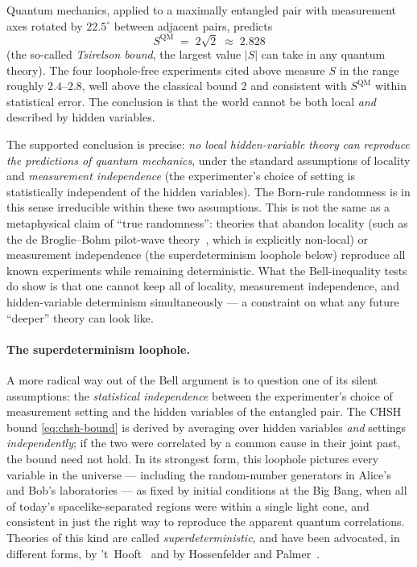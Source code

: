 Quantum mechanics, applied to a maximally entangled pair with
measurement axes rotated by $22.5^\circ$ between adjacent pairs,
predicts
\begin{equation}
\label{eq:tsirelson}
S^{\text{QM}} \;=\; 2\sqrt 2 \;\approx\; 2.828
\end{equation}
(the so-called \emph{Tsirelson bound}, the largest value $|S|$ can
take in any quantum theory). The four loophole-free experiments
cited above measure $S$ in the range roughly $2.4$--$2.8$, well
above the classical bound $2$ and consistent with $S^{\text{QM}}$
within statistical error. The conclusion is that the world cannot
be both local \emph{and} described by hidden variables.

The supported conclusion is precise: \emph{no local hidden-variable
theory can reproduce the predictions of quantum mechanics}, under
the standard assumptions of locality and \emph{measurement
independence} (the experimenter's choice of setting is statistically
independent of the hidden variables). The Born-rule randomness is
in this sense irreducible within these two assumptions. This is
not the same as a metaphysical claim of ``true randomness'':
theories that abandon locality (such as the de Broglie--Bohm
pilot-wave theory~\cite{bohm1952}, which is explicitly non-local)
or measurement independence (the superdeterminism loophole below)
reproduce all known experiments while remaining deterministic. What
the Bell-inequality tests do show is that one cannot keep all of
locality, measurement independence, and hidden-variable determinism
simultaneously --- a constraint on what any future ``deeper''
theory can look like.

\paragraph{The superdeterminism loophole.}
A more radical way out of the Bell argument is to question one of
its silent assumptions: the \emph{statistical independence} between
the experimenter's choice of measurement setting and the hidden
variables of the entangled pair. The CHSH bound \cref{eq:chsh-bound}
is derived by averaging over hidden variables \emph{and} settings
\emph{independently}; if the two were correlated by a common cause
in their joint past, the bound need not hold. In its strongest
form, this loophole pictures every variable in the universe ---
including the random-number generators in Alice's and Bob's
laboratories --- as fixed by initial conditions at the Big Bang,
when all of today's spacelike-separated regions were within a
single light cone, and consistent in just the right way to
reproduce the apparent quantum correlations. Theories of this kind
are called \emph{superdeterministic}, and have been advocated, in
different forms, by 't~Hooft~\cite{thooft2016} and by Hossenfelder
and Palmer~\cite{hossenfelder2020}.


